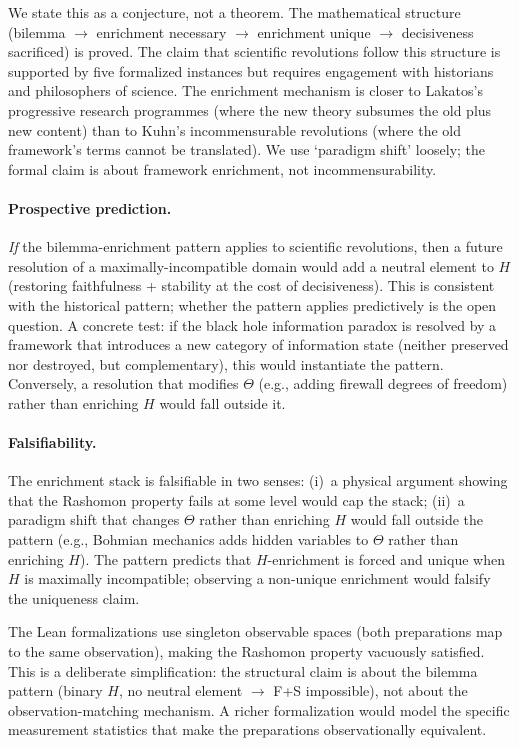 \documentclass[11pt,a4paper]{article}
\begin{document}
We state this as a conjecture, not a theorem. The mathematical structure
(bilemma $\to$ enrichment necessary $\to$ enrichment unique $\to$ decisiveness
sacrificed) is proved. The claim that scientific revolutions follow this
structure is supported by five formalized instances but requires engagement
with historians and philosophers of science.  The enrichment mechanism is closer to Lakatos's progressive research programmes (where the new theory subsumes the old plus new content) than to Kuhn's incommensurable revolutions (where the old framework's terms cannot be translated). We use `paradigm shift' loosely; the formal claim is about framework enrichment, not incommensurability.

\paragraph{Prospective prediction.}
\emph{If} the bilemma-enrichment pattern applies to scientific revolutions, then a future resolution of a maximally-incompatible domain would add a neutral element to $H$ (restoring faithfulness + stability at the cost of decisiveness).  This is consistent with the historical pattern; whether the pattern applies predictively is the open question.  A concrete test: if the black hole information paradox is resolved by a framework that introduces a new category of information state (neither preserved nor destroyed, but complementary), this would instantiate the pattern. Conversely, a resolution that modifies $\Theta$ (e.g., adding firewall degrees of freedom) rather than enriching $H$ would fall outside it.

\paragraph{Falsifiability.}
The enrichment stack is falsifiable in two senses: (i)~a physical argument showing that the Rashomon property fails at some level would cap the stack; (ii)~a paradigm shift that changes $\Theta$ rather than enriching $H$ would fall outside the pattern (e.g., Bohmian mechanics adds hidden variables to $\Theta$ rather than enriching $H$). The pattern predicts that $H$-enrichment is forced and unique when $H$ is maximally incompatible; observing a non-unique enrichment would falsify the uniqueness claim.

The Lean formalizations use singleton observable spaces (both preparations map to the same observation), making the Rashomon property vacuously satisfied.  This is a deliberate simplification: the structural claim is about the bilemma pattern (binary $H$, no neutral element $\to$ F+S impossible), not about the observation-matching mechanism.  A richer formalization would model the specific measurement statistics that make the preparations observationally equivalent.
\end{document}
